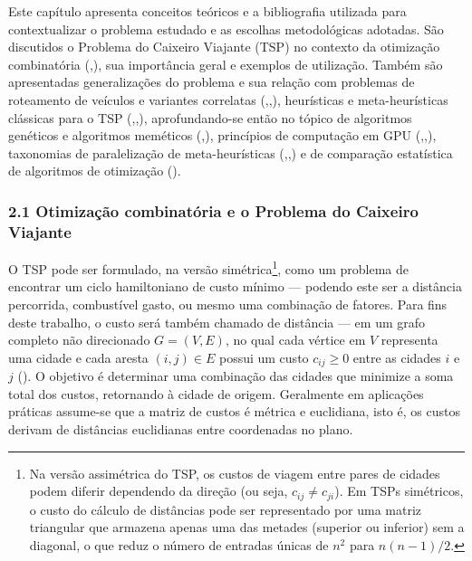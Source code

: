 Este capítulo apresenta conceitos teóricos e a bibliografia utilizada
para contextualizar o problema estudado e as escolhas metodológicas
adotadas. São discutidos o Problema do Caixeiro Viajante (TSP) no
contexto da otimização combinatória
(,),
sua importância geral e exemplos de utilização. Também são apresentadas
generalizações do problema e sua relação com problemas de roteamento de
veículos e variantes correlatas
(,,),
heurísticas e meta-heurísticas clássicas para o TSP
(,,),
aprofundando-se então no tópico de algoritmos genéticos e algoritmos
meméticos
(,),
princípios de computação em GPU
(,,),
taxonomias de paralelização de meta-heurísticas
(,,)
e de comparação estatística de algoritmos de otimização
().

\subsubsection{2.1 Otimização combinatória e o Problema do Caixeiro
Viajante}\label{sec-21-otimizacao-tsp}

O TSP pode ser formulado, na versão simétrica\footnote{Na versão
  assimétrica do TSP, os custos de viagem entre pares de cidades podem
  diferir dependendo da direção (ou seja, \(c_{ij} \neq c_{ji}\)). Em
  TSPs simétricos, o custo do cálculo de distâncias pode ser
  representado por uma matriz triangular que armazena apenas uma das
  metades (superior ou inferior) sem a diagonal, o que reduz o número de
  entradas únicas de \(n^2\) para \(n(n-1)/2\).}, como um problema de
encontrar um ciclo hamiltoniano de custo mínimo --- podendo este ser a
distância percorrida, combustível gasto, ou mesmo uma combinação de
fatores. Para fins deste trabalho, o custo será também chamado de
distância --- em um grafo completo não direcionado \(G = (V, E)\), no
qual cada vértice em \(V\) representa uma cidade e cada aresta
\((i, j) \in E\) possui um custo \(c_{ij} \geq 0\) entre as cidades
\(i\) e \(j\) (). O objetivo é
determinar uma combinação das cidades que minimize a soma total dos
custos, retornando à cidade de origem. Geralmente em aplicações práticas
assume-se que a matriz de custos é métrica e euclidiana, isto é, os
custos derivam de distâncias euclidianas entre coordenadas no plano.

